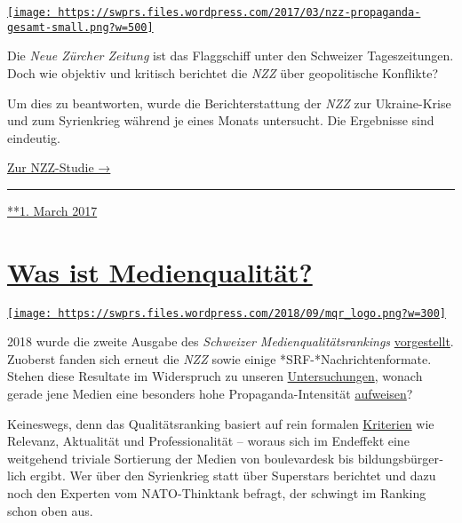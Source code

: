 \href{https://swprs.org/2017/03/01/die-nzz-studie/}{\texttt{[image: https://swprs.files.wordpress.com/2017/03/nzz-propaganda-gesamt-small.png?w=500]}}

Die \emph{Neue Zürcher Zeitung} ist das Flagg­schiff unter den Schweizer
Tages­zei­tungen. Doch wie objektiv und kritisch berichtet die
\emph{NZZ} über geo­politische Konf‌likte?

Um dies zu be­ant­worten, wurde die Bericht­erstattung der \emph{NZZ}
zur Ukraine-Krise und zum Syrien­krieg während je eines Monats
unter­sucht. Die Ergebnisse sind eindeutig.

\href{https://swprs.org/die-nzz-studie/}{Zur NZZ-Studie →}

\begin{center}\rule{0.5\linewidth}{\linethickness}\end{center}

\href{https://swprs.org/2017/03/01/die-nzz-studie/}{**1. March 2017}

\hypertarget{was-ist-medienqualituxe4t}{%
\section{\texorpdfstring{\href{https://swprs.org/2017/03/01/medienqualitaet/}{Was
ist
Medienqualität?}}{Was ist Medienqualität?}}\label{was-ist-medienqualituxe4t}}

\href{https://swprs.org/2017/03/01/medienqualitaet/}{\texttt{[image: https://swprs.files.wordpress.com/2018/09/mqr\_logo.png?w=300]}}

2018 wurde die zweite Ausgabe des \emph{Schweizer
Medien­qualitäts­rankings}
\href{http://medienqualitaet-schweiz.ch/files/3115/3578/3114/MQR-18_Hauptbefunde.pdf}{vorgestellt}.
Zuoberst fanden sich erneut die \emph{NZZ} sowie einige
*SRF-*Nach­rich­ten­for­mate. Stehen diese Resultate im Widerspruch zu
unseren \href{https://swprs.org/die-nzz-studie/}{Untersuchungen}, wonach
gerade jene Medien eine besonders hohe Propaganda-Intensität
\href{https://swprs.org/srf-propaganda-analyse/}{aufweisen}?

Keineswegs, denn das Qualitätsranking basiert auf rein formalen
\href{http://www.medienqualitaet-schweiz.ch/index.php/qualitaetsrating/}{Kriterien}
wie Relevanz, Aktualität und Professionalität -- woraus sich im
Endeffekt eine weitgehend triviale Sortierung der Medien von
boulevardesk bis bildungs­bürger­lich ergibt. Wer über den Syrienkrieg
statt über Superstars berichtet und dazu noch den Experten vom
NATO-Thinktank befragt, der schwingt im Ranking schon oben aus.


